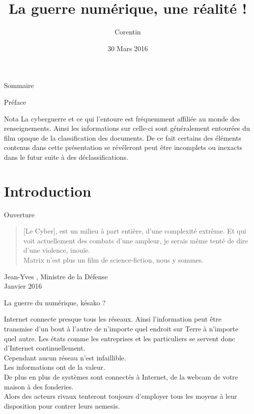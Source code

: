 \documentclass{beamer}
\title{La guerre numérique, une réalité !}
\author{Corentin \bsc{CHÉDOTAL}}
\date{30 Mars 2016}
\begin{document}
\begin{frame}
  \titlepage
\end{frame}

\begin{frame}{Sommaire}
  \tableofcontents
\end{frame}

\begin{frame}{Préface}
    \begin{alertblock}{Nota}
        La cyberguerre et ce qui l'entoure est fréquemment affiliée au monde des renseignements. Ainsi les informations sur celle-ci sont généralement entourées du film opaque de la classification des documents. De ce fait certains des éléments contenus dans cette présentation se révéleront peut être incomplets ou inexacts dans le futur suite à des déclassifications.
    \end{alertblock}
\end{frame}

\section{Introduction}

\begin{frame}{Ouverture}
  \begin{quotation}
    [Le Cyber], est un milieu à part entière, d'une complexité extrême. Et qui voit actuellement des combats d'une ampleur, je serais même tenté de dire d'une violence, inouïe.\\
    Matrix n'est plus un film de science-fiction, nous y sommes.
  \end{quotation}
  Jean-Yves , Ministre de la Défense\\
  Janvier 2016
\end{frame}

\begin{frame}{La guerre du numérique, késako ?}

    Internet connecte presque tous les réseaux. Ainsi l'information peut être transmise d'un bout à l'autre de n'importe quel endroit sur Terre à n'importe quel autre. Les états comme les entreprises et les particuliers se servent donc d'Internet continuellement.\\ Cependant aucun réseau n'est infaillible.\\
    Les informations ont de la valeur.\\
    De plus en plus de systèmes sont connectés à Internet, de la webcam de votre maison à des fonderies.\\
    Alors des acteurs rivaux tenteront toujours d'employer tous les moyens à leur disposition pour contrer leurs nemesis.

\end{frame}
\end{document}
